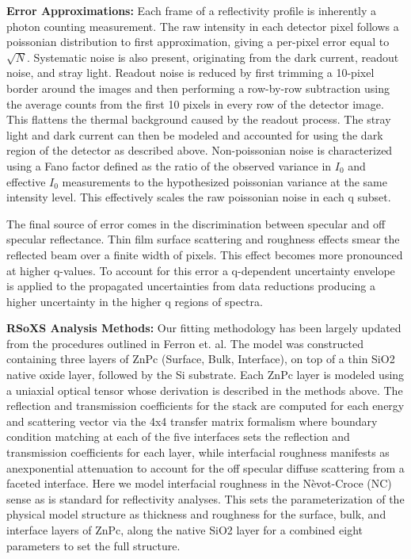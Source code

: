 \textbf{Error Approximations:} Each frame of a reflectivity profile is inherently a photon counting measurement. The raw intensity in each detector pixel follows a poissonian distribution to first approximation, giving a per-pixel error equal to \(\sqrt{N}\). Systematic noise is also present, originating from the dark current, readout noise, and stray light. Readout noise is reduced by first trimming a 10-pixel border around the images and then performing a row-by-row subtraction using the average counts from the first 10 pixels in every row of the detector image. This flattens the thermal background caused by the readout process. The stray light and dark current can then be modeled and accounted for using the dark region of the detector as described above. Non-poissonian noise is characterized using a Fano factor defined as the ratio of the observed variance in \(I_{0}\) and effective \(I_{0}\) measurements to the hypothesized poissonian variance at the same intensity level. This effectively scales the raw poissonian noise in each q subset.

The final source of error comes in the discrimination between specular and off specular reflectance. Thin film surface scattering and roughness effects smear the reflected beam over a finite width of pixels. This effect becomes more pronounced at higher q-values. To account for this error a q-dependent uncertainty envelope is applied to the propagated uncertainties from data reductions producing a higher uncertainty in the higher q regions of spectra.

\textbf{RSoXS Analysis Methods:} Our fitting methodology has been largely updated from the procedures outlined in Ferron et. al.\autocite{ferron2023composition} The model was constructed containing three layers of ZnPc (Surface, Bulk, Interface), on top of a thin SiO2 native oxide layer, followed by the Si substrate. Each ZnPc layer is modeled using a uniaxial optical tensor whose derivation is described in the methods above. The reflection and transmission coefficients for the stack are computed for each energy and scattering vector via the 4x4 transfer matrix formalism where boundary condition matching at each of the five interfaces sets the reflection and transmission coefficients for each layer, while interfacial roughness manifests as anexponential attenuation to account for the off specular diffuse scattering from a faceted interface. Here we model interfacial roughness in the Nèvot-Croce (NC) sense as is standard for reflectivity analyses.\autocite{nevot1980caracterisation,esashi2021influence} This sets the parameterization of the physical model structure as thickness and roughness for the surface, bulk, and interface layers of ZnPc, along the native SiO2 layer for a combined eight parameters to set the full structure.


